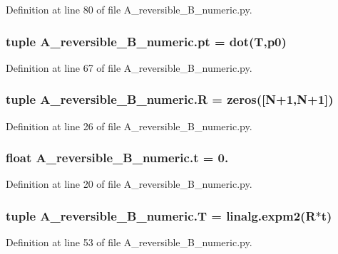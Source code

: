 Definition at line 80 of file A\+\_\+reversible\+\_\+\+B\+\_\+numeric.\+py.

\hypertarget{namespaceA__reversible__B__numeric_aae033c0920890d37257bb86daf8996f8}{
\subsubsection[{pt}]{\setlength{\rightskip}{0pt plus 5cm}tuple A\+\_\+reversible\+\_\+\+B\+\_\+numeric.\+pt = dot({\bf T},{\bf p0})}}\label{namespaceA__reversible__B__numeric_aae033c0920890d37257bb86daf8996f8}


Definition at line 67 of file A\+\_\+reversible\+\_\+\+B\+\_\+numeric.\+py.

\hypertarget{namespaceA__reversible__B__numeric_a7095a52e98b19868ca09b3ea24726258}{
\subsubsection[{R}]{\setlength{\rightskip}{0pt plus 5cm}tuple A\+\_\+reversible\+\_\+\+B\+\_\+numeric.\+R = zeros(\mbox{[}{\bf N}+1,{\bf N}+1\mbox{]})}}\label{namespaceA__reversible__B__numeric_a7095a52e98b19868ca09b3ea24726258}


Definition at line 26 of file A\+\_\+reversible\+\_\+\+B\+\_\+numeric.\+py.

\hypertarget{namespaceA__reversible__B__numeric_a63df2169b3cb7b9db0743a51320bbf4f}{
\subsubsection[{t}]{\setlength{\rightskip}{0pt plus 5cm}float A\+\_\+reversible\+\_\+\+B\+\_\+numeric.\+t = 0.}}\label{namespaceA__reversible__B__numeric_a63df2169b3cb7b9db0743a51320bbf4f}


Definition at line 20 of file A\+\_\+reversible\+\_\+\+B\+\_\+numeric.\+py.

\hypertarget{namespaceA__reversible__B__numeric_a238e2ae63555f68c3395add1edad1692}{
\subsubsection[{T}]{\setlength{\rightskip}{0pt plus 5cm}tuple A\+\_\+reversible\+\_\+\+B\+\_\+numeric.\+T = linalg.\+expm2({\bf R}$\ast${\bf t})}}\label{namespaceA__reversible__B__numeric_a238e2ae63555f68c3395add1edad1692}


Definition at line 53 of file A\+\_\+reversible\+\_\+\+B\+\_\+numeric.\+py.

